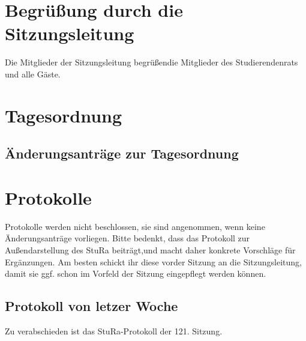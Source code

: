 \section{Begrü\ss ung durch die Sitzungsleitung}
Die Mitglieder  der  Sitzungsleitung begrüßendie  Mitglieder  des  Studierendenrats  und  alle Gäste.



\section{Tagesordnung}
\tableofcontents
\subsection{Änderungsanträge zur Tagesordnung}


\section{Protokolle}
Protokolle werden nicht beschlossen, sie sind angenommen, wenn keine Änderungsanträge vorliegen.
Bitte bedenkt, dass das Protokoll zur Außendarstellung des StuRa beiträgt,und macht daher konkrete Vorschläge
für Ergänzungen. Am besten schickt ihr diese vorder Sitzung an die Sitzungsleitung, damit sie ggf. schon im 
Vorfeld der Sitzung eingepflegt werden können.
\subsection{Protokoll von letzer Woche}
Zu verabschieden ist das StuRa-Protokoll der 121. Sitzung.
